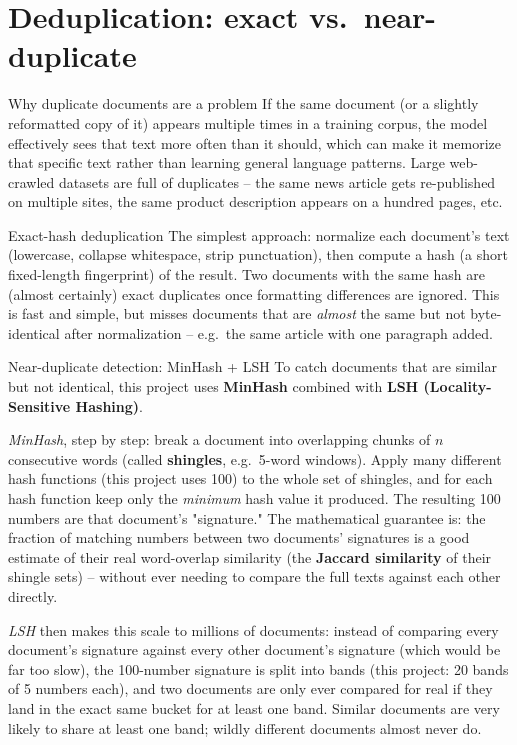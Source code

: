 \documentclass[11pt]{report}
\begin{document}
\section{Deduplication: exact vs.\ near-duplicate}

\begin{concept}{Why duplicate documents are a problem}
If the same document (or a slightly reformatted copy of it) appears
multiple times in a training corpus, the model effectively sees that text
more often than it should, which can make it memorize that specific text
rather than learning general language patterns. Large web-crawled
datasets are full of duplicates -- the same news article gets
re-published on multiple sites, the same product description appears on
a hundred pages, etc.
\end{concept}

\begin{concept}{Exact-hash deduplication}
The simplest approach: normalize each document's text (lowercase,
collapse whitespace, strip punctuation), then compute a hash (a short
fixed-length fingerprint) of the result. Two documents with the same hash
are (almost certainly) exact duplicates once formatting differences are
ignored. This is fast and simple, but misses documents that are
\textit{almost} the same but not byte-identical after normalization --
e.g.\ the same article with one paragraph added.
\end{concept}

\begin{concept}{Near-duplicate detection: MinHash + LSH}
To catch documents that are similar but not identical, this project uses
\textbf{MinHash} combined with \textbf{LSH (Locality-Sensitive
Hashing)}.

\textit{MinHash}, step by step: break a document into overlapping chunks
of $n$ consecutive words (called \textbf{shingles}, e.g.\ 5-word
windows). Apply many different hash functions (this project uses 100) to
the whole set of shingles, and for each hash function keep only the
\textit{minimum} hash value it produced. The resulting 100 numbers are
that document's "signature." The mathematical guarantee is: the fraction
of matching numbers between two documents' signatures is a good estimate
of their real word-overlap similarity (the \textbf{Jaccard similarity}
of their shingle sets) -- without ever needing to compare the full texts
against each other directly.

\textit{LSH} then makes this scale to millions of documents: instead of
comparing every document's signature against every other document's
signature (which would be far too slow), the 100-number signature is
split into bands (this project: 20 bands of 5 numbers each), and two
documents are only ever compared for real if they land in the exact same
bucket for at least one band. Similar documents are very likely to share
at least one band; wildly different documents almost never do.
\end{concept}
\end{document}
